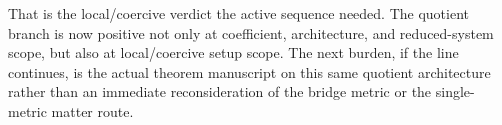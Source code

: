 \documentclass[11pt]{article}
\begin{document}
That is the local/coercive verdict the active sequence needed. The quotient branch is now positive not only at coefficient, architecture, and reduced-system scope, but also at local/coercive setup scope. The next burden, if the line continues, is the actual theorem manuscript on this same quotient architecture rather than an immediate reconsideration of the bridge metric or the single-metric matter route.
\end{document}

